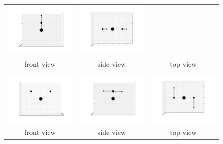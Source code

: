 \documentclass[11pt]{article}
\begin{document}
\begin{figure}[htp]
\begin{tabular}{|ccc|}
    \includegraphics[width=5.5cm,clip=true,trim=3cm 2cm 3cm 2cm]{images/0-90_4.pdf}&
    \includegraphics[width=5.5cm,clip=true,trim=3cm 2cm 3cm 2cm]{images/90-0_4.pdf}\\front view&side view&top view\\\hline&&\\
    \includegraphics[width=5.5cm,clip=true,trim=3cm 2cm 3cm 2cm]{images/0-0_5.pdf}&
    \includegraphics[width=5.5cm,clip=true,trim=3cm 2cm 3cm 2cm]{images/0-90_5.pdf}&
    \includegraphics[width=5.5cm,clip=true,trim=3cm 2cm 3cm 2cm]{images/90-0_5.pdf}\\front view&side view&top view\\\hline
    \end{tabular}
\end{figure}
\newpage
\end{document}
